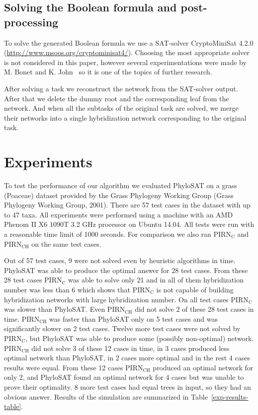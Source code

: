 \documentclass[runningheads, envcountsame, a4paper]{llncs}
\begin{document}
\subsection{Solving the Boolean formula and post-processing}

To solve the generated Boolean formula we use a SAT-solver CryptoMiniSat 4.2.0 (\url{http://www.msoos.org/cryptominisat4/}).
Choosing the most appropriate solver is not considered in this paper, however several experimentations were made by 
M. Bonet and K. John~\cite{bonet2009efficiently} so it is one of the topics of further research.

After solving a task we reconstruct the network from the SAT-solver output. After that we delete the dummy root and the corresponding 
leaf from the network. And when all the subtasks of the original task are solved, we merge their networks into a single 
hybridization network corresponding to the original task.

\section{Experiments}

To test the performance of our algorithm we evaluated PhyloSAT on a grass (Poaceae) dataset provided by the Grass Phylogeny Working Group 
(Grass Phylogeny Working Group, 2001). There are 57 test cases in the dataset with up to 47 taxa. All experiments were performed using a machine with an AMD Phenom II X6 1090T 3.2 GHz 
processor on Ubuntu 14.04. All tests were run with a reasonable time limit of 1000 seconds. For comparison we also ran PIRN$\mathrm{_C}$ and PIRN$\mathrm{_{CH}}$ 
on the same test cases. 

Out of 57 test cases, 9 were not solved even by heuristic algorithms in time. PhyloSAT was able to produce the optimal answer for 28
test cases. From these 28 test cases PIRN$\mathrm{_C}$ was able to solve only 21 and in all of them hybridization number was less than 6
which shows that PIRN$\mathrm{_C}$ is not capable of building hybridization networks with large hybridization number.
On all test cases PIRN$\mathrm{_C}$ was slower than PhyloSAT.
Even PIRN$\mathrm{_{CH}}$ did not solve 2 of these 28 test cases in time. PIRN$\mathrm{_{CH}}$ was faster than PhyloSAT only
on 5 test cases and was significantly slower on 2 test cases. Twelve more test cases were not solved by PIRN$\mathrm{_C}$, but PhyloSAT
was able to produce some (possibly non-optimal) network. PIRN$\mathrm{_{CH}}$ did not solve 3 of these 12 cases in time, in 3 cases 
produced less optimal network than PhyloSAT, in 2 cases more optimal and in the rest 4 cases results were equal. From these 12 cases PIRN$\mathrm{_{CH}}$
produced an optimal network for only 2, and PhyloSAT found an optimal network for 4 cases but was unable to prove their optimality. 
8 more test cases had equal trees in input, so they had an obvious answer.
Results of the simulation are summarized in Table~\ref{exp-results-table}.
\end{document}
